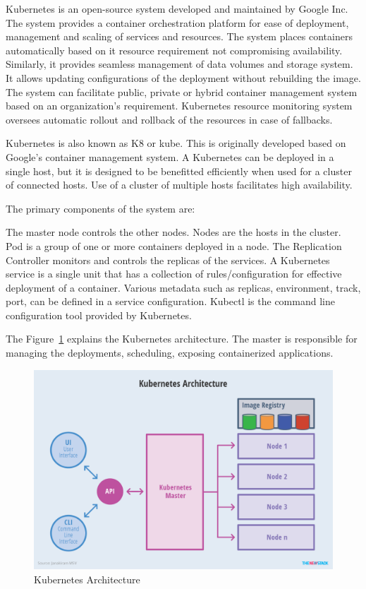Kubernetes is an open-source system developed and maintained by Google Inc.
The system provides a container orchestration platform for ease of deployment,
management and scaling of services and resources. The system places containers
automatically based on it resource requirement not compromising availability.
Similarly, it provides seamless management of data volumes and storage system.
It allows updating configurations of the deployment without rebuilding the
image. The system can facilitate public, private or hybrid container
management system based on an organization's requirement.  Kubernetes resource
monitoring system oversees automatic rollout and rollback of the resources in
case of fallbacks.


Kubernetes is also known as K8 or kube. This is originally developed based on
Google's container management system. A Kubernetes can be deployed in a single
host, but it is designed to be benefitted efficiently when used for a cluster
of connected hosts. Use of a cluster of multiple hosts facilitates high
availability.


The primary components of the system are: 

The master node controls the other nodes. Nodes are the hosts in the cluster.
Pod is a group of one or more containers deployed in a node. The Replication
Controller monitors and controls the replicas of the services. A Kubernetes
service is a single unit that has a collection of rules/configuration for
effective deployment of a container. Various metadata such as replicas,
environment, track, port, can be defined in a service configuration.  Kubectl
is the command line configuration tool provided by Kubernetes.

The Figure~\ref{fig:kube-archtecture} explains the Kubernetes architecture.
The master is responsible for managing the deployments, scheduling, exposing
containerized applications.

\begin{figure}[htb]
	\centering\includegraphics[width=\columnwidth]{images/hid_417_Kubernetes-Architecture.png}
  \caption{Kubernetes Architecture~\cite{hid-sp18-417-kubernetes}}
  \label{fig:kube-archtecture}
\end{figure}


